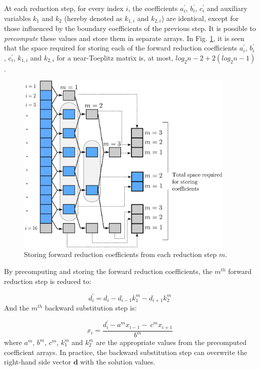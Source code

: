 \documentclass{elsarticle}
\begin{document}
At each reduction step,
for every index $i$,
the coefficients $a_i^\prime$, $b_i^\prime$, $c_i^\prime$
and auxiliary variables $k_1$ and $k_2$
(hereby denoted as $k_{1,i}$ and $k_{2,i}$) are identical,
except for those influenced by the
boundary coefficients of the previous step.
It is possible to \emph{precompute} these values
and store them in separate arrays.
In Fig. \ref{fig:cyclic-reduction-precomputing},
it is seen that the space required for storing each of the
forward reduction coefficients
$a_i^\prime$, $b_i^\prime$, $c_i^\prime$,
$k_{1,i}$ and $k_{2,i}$
for a near-Toeplitz matrix
is, at most, $log_2n-2 + 2(log_2n-1)$.

\begin{figure}[h!]
\begin{center}
\includegraphics[height=250pt]{img/cyclic-reduction-precomputing.eps}
\end{center}
\caption{Storing forward reduction coefficients
    from each reduction step $m$.}
\label{fig:cyclic-reduction-precomputing}
\end{figure}

By precomputing and storing the forward reduction
coefficients,
the $m^{th}$ forward reduction step is reduced to:

\begin{equation}
d^{\prime}_i = d_i - d_{i-1}k_1^{m}  - d_{i+1}k_2^{m}
\label{eqn:precomputed-forward-reduction-step}
\end{equation}
%
And the $m^{th}$ backward substitution step is:

\begin{equation}
x_i = \frac{d^{\prime}_i - a^mx_{i-1} - \
    c^{m}x_{i+1}}{b^m}
\label{eqn:precomputed-backward-substitution-step}
\end{equation}
%
where $a^m$, $b^m$, $c^m$, $k_1^m$ and $k_2^m$
are the appropriate values
from the precomputed coefficient arrays.
In practice,
the backward substitution step
can overwrite the right-hand side vector $\bm{d}$
with the solution values.
\end{document}
